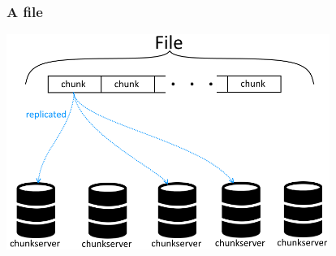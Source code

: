 \documentclass{beamer}
\newcommand{\slideheight}{7cm}
\begin{document}
%
\begin{frame}
 \frametitle{A file}
 \centering
 \includegraphics[height=\slideheight]{figures/filegfsschema.png}
\end{frame}
\end{document}

